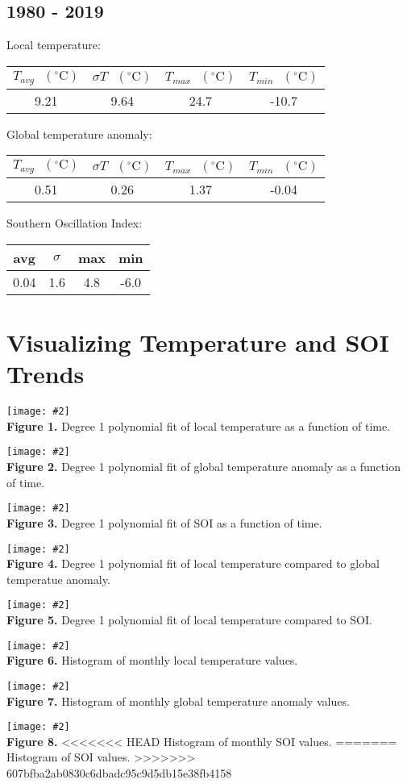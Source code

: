 \documentclass[12pt]{article}
\newcommand{\img}[4]{
 \begin{center}
 \texttt{[image: \#2]} \\
 \textbf{Figure #3.} #4
 \end{center}
}
\begin{document}
\subsection*{1980 - 2019}
Local temperature:
\begin{center}
\begin{tabular}{c | c | c | c}
 $T_{avg} \textrm{ } (^{\circ} \textrm{C})$ &
 $\sigma T \textrm{ } (^{\circ} \textrm{C})$ &
 $T_{max} \textrm{ } (^{\circ} \textrm{C})$ &
 $T_{min} \textrm{ } (^{\circ} \textrm{C})$ \\ %
 \hline
 9.21 & 9.64 & 24.7 & -10.7 \\ %
\end{tabular}
\end{center}
Global temperature anomaly:
\begin{center}
\begin{tabular}{c | c | c | c}
 $T_{avg} \textrm{ } (^{\circ} \textrm{C})$ &
 $\sigma T \textrm{ } (^{\circ} \textrm{C})$ &
 $T_{max} \textrm{ } (^{\circ} \textrm{C})$ &
 $T_{min} \textrm{ } (^{\circ} \textrm{C})$ \\ %
 \hline
 0.51 & 0.26 & 1.37 & -0.04 \\ %
\end{tabular}
\end{center}
Southern Oscillation Index:
\begin{center}
\begin{tabular}{c | c | c | c}
 avg & $\sigma$ & max & min \\ %
 \hline
 0.04 & 1.6 & 4.8 & -6.0 \\ %
\end{tabular}
\end{center}

\section*{Visualizing Temperature and SOI Trends}
\img{0.65}{../plots/fits/local.png}{1}{
 Degree 1 polynomial fit of local temperature as a
 function of time.
}
\img{0.65}{../plots/fits/global.png}{2}{
 Degree 1 polynomial fit of global temperature anomaly as a
 function of time.
}
\img{0.65}{../plots/fits/soi.png}{3}{
 Degree 1 polynomial fit of SOI as a
 function of time.
}
\img{0.65}{../plots/compare/local_vs_global.png}{4}{
 Degree 1 polynomial fit of local temperature compared
 to global temperatue anomaly.
}
\img{0.65}{../plots/compare/local_vs_soi.png}{5}{
 Degree 1 polynomial fit of local temperature compared
 to SOI.
}
\img{0.65}{../plots/histogram/local.png}{6}{
 Histogram of monthly local temperature values.
}
\img{0.65}{../plots/histogram/global.png}{7}{
 Histogram of monthly global temperature anomaly values.
}
\img{0.65}{../plots/histogram/soi.png}{8}{
<<<<<<< HEAD
 Histogram of monthly SOI values.
=======
 Histogram of SOI values.
>>>>>>> 607bfba2ab0830c6dbadc95c9d5db15e38fb4158
}
\end{document}
